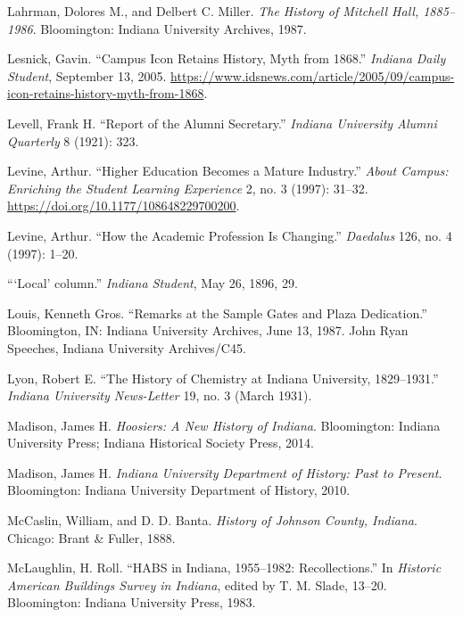 \documentclass[
  american,
  letterpaper,
]{scrreprt}
\newlength{\cslhangindent}
\newenvironment{CSLReferences}[2] %
 {\begin{list}{}{%
  \setlength{\itemindent}{0pt}
  \setlength{\leftmargin}{0pt}
  \setlength{\parsep}{0pt}
  \ifodd #1
   \setlength{\leftmargin}{\cslhangindent}
   \setlength{\itemindent}{-1\cslhangindent}
  \fi
  \setlength{\itemsep}{#2\baselineskip}}}
 {\end{list}}
\begin{document}
\begin{CSLReferences}{1}{0}
Lahrman, Dolores M., and Delbert C. Miller. \emph{The History of
Mitchell Hall, 1885--1986}. Bloomington: Indiana University Archives,
1987.

Lesnick, Gavin. {``Campus Icon Retains History, Myth from 1868.''}
\emph{Indiana Daily Student}, September 13, 2005.
\url{https://www.idsnews.com/article/2005/09/campus-icon-retains-history-myth-from-1868}.

Levell, Frank H. {``Report of the Alumni Secretary.''} \emph{Indiana
University Alumni Quarterly} 8 (1921): 323.

Levine, Arthur. {``Higher Education Becomes a Mature Industry.''}
\emph{About Campus: Enriching the Student Learning Experience} 2, no. 3
(1997): 31--32. \url{https://doi.org/10.1177/108648229700200}.

Levine, Arthur. {``How the Academic Profession Is Changing.''}
\emph{Daedalus} 126, no. 4 (1997): 1--20.

{``{{`Local'} column}.''} \emph{Indiana Student}, May 26, 1896, 29.

Louis, Kenneth Gros. {``Remarks at the Sample Gates and Plaza
Dedication.''} Bloomington, IN: Indiana University Archives, June 13,
1987. John Ryan Speeches, Indiana University Archives/C45.

Lyon, Robert E. {``The History of Chemistry at Indiana University,
1829--1931.''} \emph{Indiana University News-Letter} 19, no. 3 (March
1931).

Madison, James H. \emph{Hoosiers: A New History of Indiana}.
Bloomington: Indiana University Press; Indiana Historical Society Press,
2014.

Madison, James H. \emph{Indiana University Department of History: Past
to Present}. Bloomington: Indiana University Department of History,
2010.

McCaslin, William, and D. D. Banta. \emph{History of Johnson County,
Indiana}. Chicago: Brant \& Fuller, 1888.

McLaughlin, H. Roll. {``HABS in Indiana, 1955--1982: Recollections.''}
In \emph{Historic American Buildings Survey in Indiana}, edited by T. M.
Slade, 13--20. Bloomington: Indiana University Press, 1983.


\end{CSLReferences}
\end{document}
